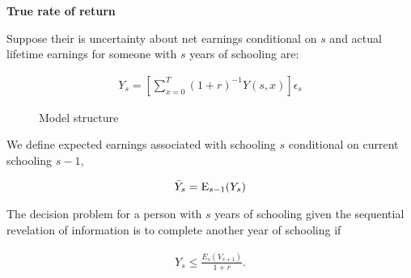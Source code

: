 \begin{frame}\begin{center}
	\LARGE\textbf{True rate of return}
\end{center}\end{frame}
\begin{frame}
Suppose their is uncertainty about net earnings conditional on $s$ and actual lifetime earnings for someone with $s$ years of schooling are:

\begin{align*}
Y_s = \left[\sum^T_{x = 0}(1 + r)^{-1} Y(s, x)\right]\epsilon_s
\end{align*}
\end{frame}
\begin{frame}
\begin{figure}[htp]\centering
\caption{Model structure}
\end{figure}
\end{frame}
\begin{frame}
We define expected earnings associated with schooling $s$ conditional on current schooling $s - 1$,

\begin{align*}
\bar{Y}_s = \mathrm{E}_{s - 1}(Y_s)
\end{align*}

\end{frame}
\begin{frame}
The decision problem for a person with $s$ years of schooling given the sequential revelation of information is to complete another year of schooling if

\begin{align*}
Y_s \leq \frac{E_s(V_{s+1})}{1 + r}.
\end{align*}

\end{frame}
